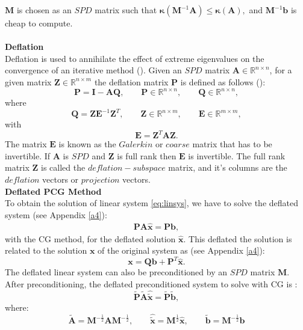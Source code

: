 \documentclass[12pt]{article}
\numberwithin{equation}{section}
\begin{document}
$\mathbf{M}$ is chosen as an $SPD$ matrix such that $\mathbf{\kappa}(\mathbf{M}^{-1}\mathbf{A})\leq \mathbf{\kappa}(\mathbf{A}),$ and $\mathbf{M}^{-1}\mathbf{b}$ is cheap to compute.\\\\
\textbf{Deflation}\\
Deflation is used to annihilate the effect of extreme eigenvalues on the convergence of an iterative method (\cite{Vuik99}). 
Given an $SPD$ matrix $\mathbf{A} \in \mathbb{R}^{n \times n}$, for a given matrix $\mathbf{Z}\in \mathbb{R}^{n\times m}$ the deflation matrix $\mathbf{P}$ is defined as follows (\cite{Tang08,Tang09}):
$$\mathbf{P}=\mathbf{I}-\mathbf{A}\mathbf{Q}, \qquad \mathbf{P} \in \mathbb{R}^{n \times n}, \qquad \mathbf{Q} \in \mathbb{R}^{n \times n},$$
where
$$\mathbf{Q}=\mathbf{Z}\mathbf{E}^{-1}\mathbf{Z}^T, \qquad \mathbf{Z} \in \mathbb{R}^{n \times m}, \qquad \mathbf{E} \in \mathbb{R}^{m \times m}, $$
with
$$\mathbf{E}=\mathbf{Z}^T\mathbf{A}\mathbf{Z}.$$
The matrix $\mathbf{E}$ is known as the $Galerkin$ or $coarse$ matrix that has to be invertible. 
If $\mathbf{A}$ is $SPD$ and $\mathbf{Z}$ is full rank then $\mathbf{E}$ is invertible. 
The full rank matrix $\mathbf{Z}$ is called the $deflation-subspace$ matrix, 
and it's columns are the
$deflation$ vectors or $projection$ vectors.\\
\textbf{Deflated PCG Method}\\
\hspace{0.5cm}To obtain the solution of linear system \eqref{eq:linsys}, we have to solve the deflated system (see Appendix \ref{a4}):
\begin{align}\label{eq:defsol}
\mathbf{P}\mathbf{A} \hat{\mathbf{x}}=\mathbf{P}\mathbf{b},
\end{align}
with the CG method, for the deflated solution $\hat{\mathbf{x}}$. 
This deflated the solution is related to the solution $\mathbf{x}$ of the original system as (see Appendix \ref{a4}):
\begin{equation}\label{eq:xfromxh}
    \mathbf{x}=\mathbf{Q}\mathbf{b}+\mathbf{P}^T\mathbf{\hat{x}}.
\end{equation}
The deflated linear system can also be preconditioned by an $SPD$ matrix $\mathbf{M}$. After preconditioning, the deflated preconditioned system to solve with CG is \cite{Tang09}:
$$\tilde{\mathbf{P}} \tilde{\mathbf{A}} \hat{\tilde{\mathbf{x}}}=\tilde{\mathbf{P}}\tilde{\mathbf{b}},$$
where:
\begin{equation*}
 \tilde{\mathbf{A}}=\mathbf{M}^{-\frac{1}{2}}\mathbf{A}\mathbf{M}^{-\frac{1}{2}}, \qquad \hat{\tilde{\mathbf{x}}}=\mathbf{M}^{\frac{1}{2}}\hat{\mathbf{x}}, \qquad
 \tilde{\mathbf{b}}=\mathbf{M}^{-\frac{1}{2}}\mathbf{b}
\end{equation*}
\end{document}

